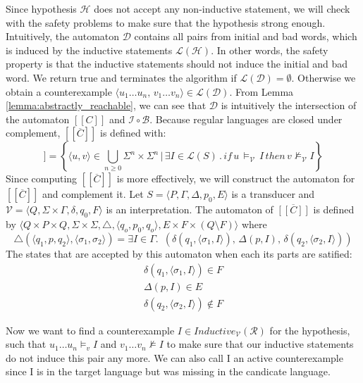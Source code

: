 Since hypothesis $\mathcal{H}$ does not accept any 
non-inductive statement, we will check with the safety problems
to make sure that the hypothesis strong enough.
Intuitively, the automaton $\mathcal{D}$ contains all pairs from initial and bad words,
which is induced by the inductive statements $\mathcal{L}(\mathcal{H})$.
In other words, the safety property is that the inductive statements should not induce the
initial and bad word. We return true and terminates the algorithm if $\mathcal{L}(\mathcal{D}) = \emptyset$.
Otherwise we obtain a counterexample 
$\langle u_1 \dots u_n, \, v_1 \dots v_n \rangle \in \mathcal{L}(\mathcal{D})$.
From Lemma \ref{lemma:abstractly_reachable}, we can see that $\mathcal{D}$ is intuitively the intersection of
the automaton $[[C]]$ and $\mathcal{I} \circ  \mathcal{B}$.
Because regular languages are closed under complement, $[[\overline{C}]]$ is defined with:
\begin{equation}
    [[\overline{C}]] = \left\lbrace \langle u,v\rangle \in \bigcup_{n \geq 0} \Sigma^n \times \Sigma^n \, | \, \exists I \in \mathcal{L}(S) \, . \, if \, u \, \models_{\mathcal{V}} \, I \, then \, v \not\models_{\mathcal{V}} I \right\rbrace
\end{equation}
Since computing $[[\overline{C}]]$ is more effectively, we will construct the automaton for $[[\overline{C}]]$ and complement it.
Let $S =  \langle P, \Gamma, \Delta, p_0, E \rangle$ 
is a transducer and  $\mathcal{V} =  \langle Q, \Sigma \times \Gamma, \delta, q_0, F \rangle$ is 
an interpretation. The automaton of $\overline{[[C]]}$ 
is defined by $\langle Q \times P \times Q, \Sigma \times \Sigma, \triangle, \langle q_o,  p_0, q_o \rangle, 
E \times F \times (Q \setminus F) \rangle$ where
\begin{equation*}
    \triangle(\langle q_1, p, q_2 \rangle, \langle \sigma_1, \sigma_2 \rangle) =  \exists I \in \Gamma. \,\,\,
    (\delta(q_1, \langle \sigma_1, I \rangle) ,\, \Delta(p, I) ,\, \delta(q_2, \langle \sigma_2, I \rangle))
\end{equation*}
The states that are accepted by this automaton when each its parts are satified: 
\begin{align*} 
    \delta(q_1, \langle \sigma_1, I \rangle) \in  F \\
    \Delta(p, I) \in E \\
    \delta(q_2, \langle \sigma_2, I \rangle) \notin  F
\end{align*}

Now we want to find a counterexample $I \in Inductive_{\mathcal{V}}(\mathcal{R})$ for the hypothesis, such that $u_1 \dots u_n \models_v I$
and $v_1 \dots v_n \not\models I$ to make sure that our inductive statements do not
induce this pair any more.
We can also call I an active counterexample since I is in the target language but was missing in 
the candicate language. 

